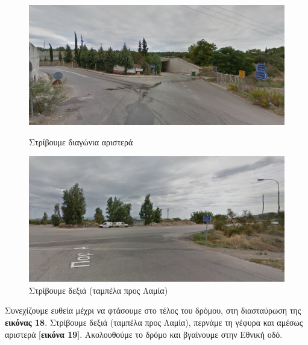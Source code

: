 \begin{figure}[hbp!]
		\includegraphics[width=\textwidth]{images/athina-lamia/tragana/tragana5.PNG}
			\caption{Στρίβουμε διαγώνια αριστερά}

		\includegraphics[width=\textwidth]{images/athina-lamia/tragana/tragana6.PNG}
			\caption{Στρίβουμε δεξιά (ταμπέλα προς Λαμία)}
\end{figure}			

Συνεχίζουμε ευθεία μέχρι να φτάσουμε στο τέλος του δρόμου, στη διασταύρωση της \textbf{εικόνας 18}. Στρίβουμε δεξιά (ταμπέλα προς Λαμία), περνάμε τη γέφυρα και αμέσως αριστερά [\textbf{εικόνα 19}]. Ακολουθούμε το δρόμο και βγαίνουμε στην Εθνική οδό.

